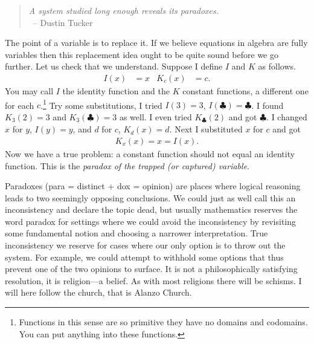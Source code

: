 \begin{quote}
\emph{A system studied long enough reveals its paradoxes.}\\
~\hfill-- Dustin Tucker
\end{quote}
The point of a variable is to replace it.  If we believe equations 
in algebra are fully variables then this replacement idea ought
to be quite sound before we go further.  Let us check that we understand.
Suppose I define $I$ and $K$ as follows.
\begin{align*}
    I(x) & = x & 
    K_c(x) & = c.
\end{align*}
You may call $I$ the identity function and the $K$ constant functions,
a different one for each $c$.\footnote{Functions in this sense are so primitive 
they have no domains and codomains.  You can put anything into these functions.}
Try some substitutions, I tried $I(3)=3$, $I(\clubsuit)=\clubsuit$.
I found $K_3(2)=3$ and $K_3(\clubsuit)=3$ as well.  I even tried 
$K_{\clubsuit}(2)$ and got $\clubsuit$.  I changed $x$ for $y$, 
$I(y)=y$, and $d$ for $c$, $K_d(x)=d$. Next I substituted $x$ for $c$ and got
\begin{align*}
    K_x(x)=x=I(x).
\end{align*}
Now we have a true problem: a constant function should not equal 
an identity function.  This is the \emph{paradox of the trapped (or captured) variable}.

Paradoxes (para = distinct + dox = opinion) are places where logical 
reasoning leads to two seemingly opposing conclusions.  We could just 
as well call this an inconsistency and declare the topic dead, but usually 
mathematics reserves the word paradox for settings where we could avoid the 
inconsistency by revisiting some fundamental notion and choosing a narrower 
interpretation.  True inconsistency we reserve for cases where our only option 
is to throw out the system.  For example, we could attempt to withhold some options that thus prevent one of the two opinions to surface.  It is not a philosophically satisfying resolution, it is religion---a belief.
As with most religions there will be schisms.  I will here follow the 
church, that is Alanzo Church.
